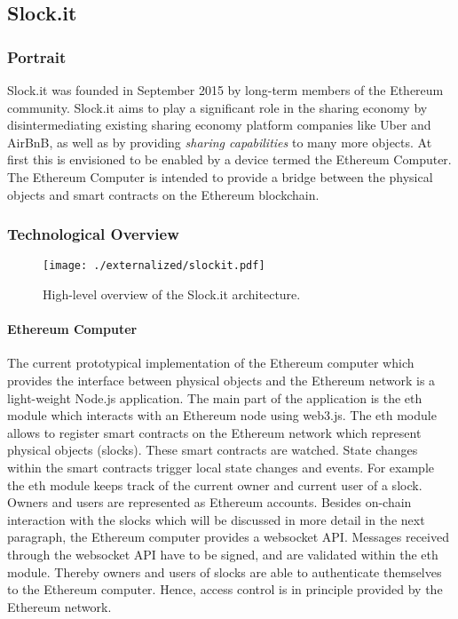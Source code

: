 \subsection{Slock.it}

\subsubsection{Portrait}
Slock.it was founded in September 2015 by long-term members of the Ethereum community. Slock.it aims to play a significant role in the sharing economy by disintermediating existing sharing economy platform companies like Uber and AirBnB, as well as by providing \emph{sharing capabilities} to many more objects. At first this is envisioned to be enabled by a device termed the Ethereum Computer. The Ethereum Computer is intended to provide a bridge between the physical objects and smart contracts on the Ethereum blockchain.


\subsubsection{Technological Overview}

\begin{figure}
\centering
\texttt{[image: ./externalized/slockit.pdf]}
\caption{High-level overview of the Slock.it architecture. }
\label{fig:21marketplace}
\end{figure}


\paragraph{Ethereum Computer}

The current prototypical implementation of the Ethereum computer which provides the interface between physical objects and the Ethereum network is a light-weight Node.js application. The main part of the application is the eth module which interacts with an Ethereum node using web3.js. The eth module allows to register smart contracts on the Ethereum network which represent physical objects (slocks). These smart contracts are watched. State changes within the smart contracts trigger local state changes and events.
For example the eth module keeps track of the current owner and current user of a slock. Owners and users are represented as Ethereum accounts. Besides on-chain interaction with the slocks which will be discussed in more detail in the next paragraph, the Ethereum computer provides a websocket API. Messages received through the websocket API have to be signed, and are validated within the eth module. Thereby owners and users of slocks are able to authenticate themselves to the Ethereum computer. Hence, access control is in principle provided by the Ethereum network.

